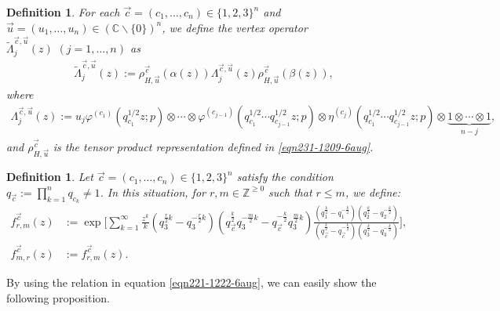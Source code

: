 \documentclass[12pt,reqno,a4paper]{amsart}
\newcommand{\tens}{\otimes}
\newcommand{\bb}[1]{\mathbb{#1}}
\numberwithin{equation}{section}
\newtheorem{dfn}[thm]{Definition}
\theoremstyle{definition}
\begin{document}
\begin{dfn}
For each $\vec{c} = (c_1,\dots,c_n) \in \{1,2,3\}^n$ and $\vec{u} = (u_1,\dots,u_n) \in (\bb{C} \backslash \{0\})^n$, we define the vertex operator $\widetilde{\Lambda}^{\vec{c},\vec{u}}_j(z) \,\, (j = 1,\dots,n)$ as 
\begin{align}
	\widetilde{\Lambda}^{\vec{c},\vec{u}}_j(z)
	:= 
	\rho^{\vec{c}}_{H,\vec{u}}\left(\alpha(z)\right)
	\Lambda^{\vec{c},\vec{u}}_j(z)
	\rho^{\vec{c}}_{H,\vec{u}}\left(\beta(z)\right),
\end{align}
where 
\begin{align}
	\Lambda^{\vec{c},\vec{u}}_j(z) := 
	u_j
	\varphi^{(c_1)}(q_{c_1}^{1/2}z;p) \tens \cdots \tens \varphi^{(c_{j-1})}(q_{c_1}^{1/2} \cdots q_{c_{j-1}}^{1/2}z;p) 	
	\tens \eta^{(c_j)}(q_{c_1}^{1/2} \cdots q_{c_{j-1}}^{1/2}z;p) \tens 
	\underbrace{	1 \tens \cdots \tens 1				}_{n - j}, 
\label{eqn238-0000-7aug}
\end{align}
and $\rho^{\vec{c}}_{H,\vec{u}}$ is the tensor product representation defined in \eqref{eqn231-1209-6aug}. 
\end{dfn}

\begin{dfn}
Let $\vec{c} = (c_1,\dots,c_n) \in \{1,2,3\}^n$ satisfy the condition $q_{\vec{c}} := \prod_{k = 1}^{n}q_{c_k} \neq 1$. In this situation, for $r, m \in \bb{Z}^{\geq 0}$ such that $r \leq m$, we define:
\begin{align}
	f^{\vec{c}}_{r,m}(z)
	&:=
	\exp\bigg[
	\sum_{k = 1}^{\infty}\frac{z^k}{k}
	(q_3^{\frac{r}{2}k} - q_3^{-\frac{r}{2}k})(q_{\vec{c}}^{\frac{k}{2}}q^{-\frac{m}{2}k}_{3}
	- q_{\vec{c}}^{-\frac{k}{2}}q^{\frac{m}{2}k}_{3})
	\frac{
		(q^{\frac{k}{2}}_1 - q^{-\frac{k}{2}}_1)(q^{\frac{k}{2}}_2 - q^{-\frac{k}{2}}_2)
	}{
		(q^{\frac{k}{2}}_{\vec{c}} - q^{-\frac{k}{2}}_{\vec{c}})(q^{\frac{k}{2}}_3 - q^{-\frac{k}{2}}_3)
	}
	\bigg],
	\\
	f^{\vec{c}}_{m,r}(z)
	&:=
	f^{\vec{c}}_{r,m}(z). 
\end{align}
\end{dfn}

By using the relation in equation \eqref{eqn221-1222-6aug}, we can easily show the following proposition. 
\end{document}
